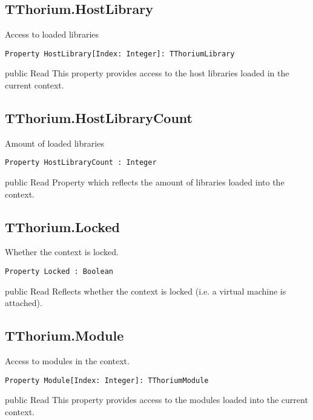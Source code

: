 \subsection{TThorium.HostLibrary}
\label{thoriumcorepkg:thorium:tthorium:hostlibrary}
\begin{FPCList}
\Synopsis
Access to loaded libraries\Declaration 

\begin{verbatim}
Property HostLibrary[Index: Integer]: TThoriumLibrary
\end{verbatim}
\Visibility
public
\Access
Read
\Description
This property provides access to the host libraries loaded in the current context.\end{FPCList}
\subsection{TThorium.HostLibraryCount}
\label{thoriumcorepkg:thorium:tthorium:hostlibrarycount}
\begin{FPCList}
\Synopsis
Amount of loaded libraries\Declaration 

\begin{verbatim}
Property HostLibraryCount : Integer
\end{verbatim}
\Visibility
public
\Access
Read
\Description
Property which reflects the amount of libraries loaded into the context.\end{FPCList}
\subsection{TThorium.Locked}
\label{thoriumcorepkg:thorium:tthorium:locked}
\begin{FPCList}
\Synopsis
Whether the context is locked.\Declaration 

\begin{verbatim}
Property Locked : Boolean
\end{verbatim}
\Visibility
public
\Access
Read
\Description
Reflects whether the context is locked (i.e. a virtual machine is attached).\end{FPCList}
\subsection{TThorium.Module}
\label{thoriumcorepkg:thorium:tthorium:module}
\begin{FPCList}
\Synopsis
Access to modules in the context.\Declaration 

\begin{verbatim}
Property Module[Index: Integer]: TThoriumModule
\end{verbatim}
\Visibility
public
\Access
Read
\Description
This property provides access to the modules loaded into the current context.\end{FPCList}
